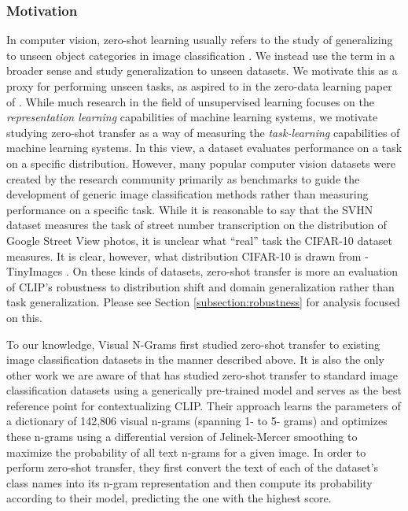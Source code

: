 \documentclass{article}
\begin{document}
\subsubsection{Motivation}

In computer vision, zero-shot learning usually refers to the study of generalizing to unseen object categories in image classification \citep{lampert2009learning}. We instead use the term in a broader sense and study generalization to unseen datasets. We motivate this as a proxy for performing unseen tasks, as aspired to in the zero-data learning paper of \citet{larochelle2008zero}. While much research in the field of unsupervised learning focuses on the \textit{representation learning} capabilities of machine learning systems, we motivate studying zero-shot transfer as a way of measuring the \textit{task-learning} capabilities of machine learning systems. In this view, a dataset evaluates performance on a task on a specific distribution. However, many popular computer vision datasets were created by the research community primarily as benchmarks to guide the development of generic image classification methods rather than measuring performance on a specific task. While it is reasonable to say that the SVHN dataset measures the task of street number transcription on the distribution of Google Street View photos, it is unclear what ``real'' task the CIFAR-10 dataset measures. It is clear, however, what distribution CIFAR-10 is drawn from - TinyImages \citep{torralba200880}. On these kinds of datasets, zero-shot transfer is more an evaluation of CLIP's robustness to distribution shift and domain generalization rather than task generalization. Please see Section \ref{subsection:robustness} for analysis focused on this.


To our knowledge, Visual N-Grams \citep{li2017learning} first studied zero-shot transfer to existing image classification datasets in the manner described above. It is also the only other work we are aware of that has studied zero-shot transfer to standard image classification datasets using a generically pre-trained model and serves as the best reference point for contextualizing CLIP. Their approach learns the parameters of a dictionary of 142,806 visual n-grams (spanning 1- to 5- grams) and optimizes these n-grams using a differential version of Jelinek-Mercer smoothing to maximize the probability of all text n-grams for a given image. In order to perform zero-shot transfer, they first convert the text of each of the dataset's class names into its n-gram representation and then compute its probability according to their model, predicting the one with the highest score.
\end{document}
